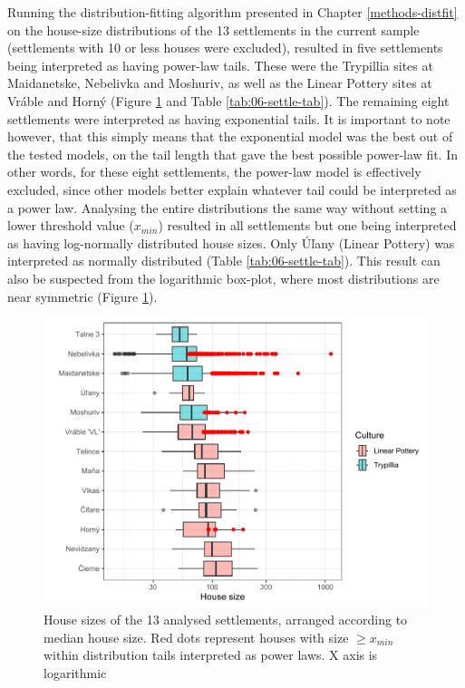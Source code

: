 \documentclass[
  12pt,
]{book}
\begin{document}
Running the distribution-fitting algorithm presented in Chapter \ref{methods-distfit} on the house-size distributions of the 13 settlements in the current sample (settlements with 10 or less houses were excluded), resulted in five settlements being interpreted as having power-law tails. These were the Trypillia sites at Maidanetske, Nebelivka and Moshuriv, as well as the Linear Pottery sites at Vráble and Horný (Figure \ref{fig:06-settle-box} and Table \ref{tab:06-settle-tab}). The remaining eight settlements were interpreted as having exponential tails. It is important to note however, that this simply means that the exponential model was the best out of the tested models, on the tail length that gave the best possible power-law fit. In other words, for these eight settlements, the power-law model is effectively excluded, since other models better explain whatever tail could be interpreted as a power law. Analysing the entire distributions the same way without setting a lower threshold value (\(x_{min}\)) resulted in all settlements but one being interpreted as having log-normally distributed house sizes. Only Úľany (Linear Pottery) was interpreted as normally distributed (Table \ref{tab:06-settle-tab}). This result can also be suspected from the logarithmic box-plot, where most distributions are near symmetric (Figure \ref{fig:06-settle-box}).



\begin{figure}

{\centering \includegraphics[width=0.9\linewidth]{bookdown-demo_files/figure-latex/06-settle-box-1} 

}

\caption{House sizes of the 13 analysed settlements, arranged according to median house size. Red dots represent houses with size \(\geq x_{min}\) within distribution tails interpreted as power laws. X axis is logarithmic}\label{fig:06-settle-box}
\end{figure}
\end{document}
